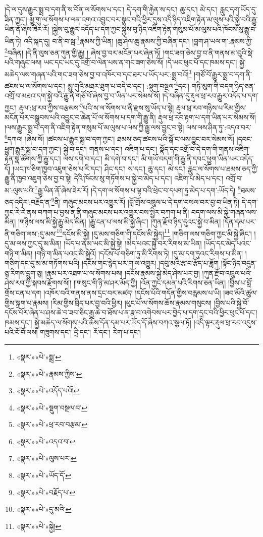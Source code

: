 །དེ་ལ་དུས་རྒྱུར་སྨྲ་བ་དག་ནི་ས་བོན་ལ་སོགས་པ་དང་། དེ་དག་གི་རྐྱེན་ས་དང་། ཆུ་དང་། མེ་དང་། རླུང་དག་ཡོད་དུ་ཟིན་ཀྱང་། མྱུ་གུ་ལ་སོགས་པ་ལན་འགའ་འབྱུང་བར་སྣང་བའི་ཕྱིར་དུས་འདི་ཉིད་འཇིག་རྟེན་མ་ལུས་པའི་སྐྱེ་བའི་རྒྱུ་ཡིན་ནོ་ཞེས་ཟེར་རོ། །སྐྱེས་བུ་རྒྱུར་འདོད་པ་དག་ཀྱང་སྐྱེས་བུ་ཉིད་འཇིག་རྟེན་གསུམ་པོ་མ་ལུས་པའི་ཁོངས་སུ་རྒྱུ་བ་ཡིན་ཏེ། འདི་སྐད་དུ། བ་ནི་བ་སྦ་\footnote{«སྣར་»«པེ་»སྨྲ་}རྣམས་ཀྱི་ཡིན། །ཆུ་ཤེལ་ཆུ་རྣམས་ཀྱི་བཞིན་དང་། །བླག་ཤ་ཡལ་ག་:རྣམས་ཀྱི་\footnote{«སྣར་»«པེ་»རྣམས་ཀྱིས་}བཞིན། །དེ་ནི་ལུས་ཅན་ཀུན་གྱི་རྒྱུ། །
ཞེས་བྱ་བར་མངོན་པར་ཞེན་ཏོ། །གང་ཟག་ཅེས་བྱ་བ་ནི་གནས་མ་བུའི་སྡེ་པའི་གཞུང་ལས། ཡང་དང་ཡང་དུ་འགྲོ་བ་ལེན་པས་ན་གང་ཟག་ཅེས་སོ། །དེ་ཡང་ཕུང་པོ་དང་ཁམས་དང་། སྐྱེ་མཆེད་ལས་གཞན་པའི་གང་ཟག་ཅེས་བྱ་བ་འཁོར་བ་དང་ཐར་པ་ཡོད་པར་:སྨྲ་བའོ།\footnote{«སྣར་»«པེ་»འདོད་པའོ།} །གཙོ་བོ་རྒྱུར་སྨྲ་བ་དག་ནི་ཚངས་པ་ལ་སོགས་པ་དང་། མྱུ་གུའི་མཐར་ཐུག་པ་བདེ་བ་དང་། :སྡུག་བསྔལ་\footnote{«སྣར་»«པེ་»སྡུག་བསྔལ་བ་}དང་། གཏི་མུག་གི་བདག་ཉིད་ཅན་འགྲོ་བ་མཐའ་དག་སྐྱེ་བའི་རྒྱུ་ནི་གཙོ་བོ་ཞེས་བྱ་བ་ཡིན་པར་སེམས་སོ། །དེ་བཞིན་དུ་རྡུལ་ཕྲ་རབ་རྒྱུར་འདོད་པ་དག་ཀྱང་། རྡུལ་:ཕྲ་རབ་ཀྱིས་བརྩམས་\footnote{«སྣར་»«པེ་»ཕྲ་རབ་བརྩམ་}པའི་ས་ལ་སོགས་པ་ནི་རྫས་སུ་ཡོད་པ་སྟེ། རྡུལ་ཕྲ་རབ་གཉིས་པ་རིམ་གྱིས་མངོན་པར་བསྒྲུབས་པའི་འབྱུང་བ་ཆེན་པོ་ལ་སོགས་པ་དག་གི་རྒྱུ་ནི། རྡུལ་ཕྲ་རབ་རྟག་པ་དག་ཡིན་པར་སེམས་སོ། །ལས་རྒྱུར་སྨྲ་བ་དག་ནི་འཇིག་རྟེན་གསུམ་པོ་མ་ལུས་པ་ལས་ཀྱི་རྒྱུ་ལས་བྱུང་བ་སྟེ། ལས་ལས་ཤིན་ཏུ་:འདའ་བར་\footnote{«སྣར་»«པེ་»འདའ་བ་}དཀའ། །ཞེས་སོ། །ཚངས་པ་རྒྱུར་སྨྲ་བ་དག་ཀྱང་། ཐམས་ཅད་ཚངས་པའི་སྒོ་ང་ལས་བྱུང་བར་སེམས་སོ། །དབང་ཕྱུག་རྒྱུར་སྨྲ་བ་དག་ཀྱང་། སྐྱེ་བ་དང་། གནས་པ་དང་། འཇིག་པ་དང་། སྣོད་དང་འགྲོ་བ་དེ་དག་གི་གནས་འཇིག་རྟེན་སྣ་ཚོགས་ཀྱི་རྒྱུ་དང་། ལས་དགེ་བ་དང་། མི་དགེ་བ་དང་། མི་གཡོ་བདག་གི་རྒྱུ་ནི་དབང་ཕྱུག་ཡིན་པར་འདོད་དོ། །ཡང་ཁ་ཅིག་ཁྱབ་འཇུག་ཅེས་པ་རི་དང་། ཤིང་དང་། ས་དང་། ཆུ་དང་། མེ་དང་། རླུང་ལ་སོགས་པ་ཐམས་ཅད་ཀྱི་རྒྱུ་ནི་ཁྱབ་འཇུག་ཅེས་བྱ་བ་སྟེ། དེའི་ཁོངས་སུ་གཏོགས་པ་སྐྱེ་བ་མེད་པ་དང་། འཇིག་པ་མེད་པ་དང་། འགྲོ་བ་མ་:ལུས་པའི་\footnote{«སྣར་»«པེ་»ལུས་པར་}རྒྱུ་ཡིན་ནོ་ཞེས་ཟེར་རོ། །དེ་དག་ལ་སོགས་པ་ལྟ་བའི་ཕྲེང་བ་དཔག་ཏུ་མེད་པ་དག་:ཡོད་དེ། \footnote{«སྣར་»«པེ་»ཡོད་དོ་}ཐམས་ཅད་འདིར་:བརྗོད་ན་\footnote{«སྣར་»«པེ་»བརྗོད་པ་}ནི། གཞུང་མངས་པར་འགྱུར་རོ། །བློ་གྲོས་འཁྲུལ་པ་དེ་དག་བསལ་བར་བྱ་བ་ཡིན་ཏེ། དེ་དག་ཀྱང་རེ་རེ་ནས་བཀག་པ་བྱས་ན་ནི་གཞུང་མངས་པར་འགྱུར་བས་སྤྱིར་བཀག་པ་ནི། བདག་ལས་མི་སྐྱེ་གཞན་ལས་མིན། །གཉིས་ལས་མི་སྐྱེ་རྒྱུ་མེད་མིན། །རྒྱུ་ངན་པ་ལས་མི་སྐྱེ་ཞིང་། །ཀུན་རྫོབ་ཉིད་དུའང་སྐྱེ་བ་མིན། །དོན་དམ་པར་ནི་གཅིག་ལས་:དུ་མས་\footnote{«སྣར་»«པེ་»དུ་མའི་}དངོས་མི་སྐྱེ། །དུ་མས་གཅིག་གི་དངོས་མི་སྐྱེད།\footnote{«སྣར་»«པེ་»སྐྱེ།} །གཅིག་ལས་གཅིག་ཀྱང་མི་སྐྱེ་ཞིང་། །དུ་མ་ལས་ཀྱང་དུ་མ་མིན། །ཡོད་པ་ནམ་ཡང་མི་སྐྱེ་སྟེ། །མེད་པའང་སྐྱེ་བར་རིགས་མ་ཡིན། །ཡོད་དང་མེད་པའང་གཉི་ག་མིན། །གཉི་ག་མིན་པའང་མི་སྐྱེའོ། །དངོས་པོ་གཅིག་ཏུ་མི་རིགས་ཏེ། །དུ་མ་དག་ཏུའང་རིགས་པ་མིན། །གཅིག་དང་དུ་མ་མ་གཏོགས་པའི། །དངོས་གང་རྙེད་པར་ག་ལ་འགྱུར། །དབུ་མའི་རྩ་བ་རྩོད་པ་ཟློག །སྟོང་ཉིད་བདུན་ཅུ་རིགས་དྲུག་ཅུ། །རྣམ་པར་འཐག་པ་ལ་སོགས་པས། །དངོས་རྣམས་སྐྱེ་མེད་ཤེས་པར་བྱ། །ཀུན་རྫོབ་འཁྲུལ་པའི་ཤེས་རབ་ཀྱི་སྐབས་རྫོགས་སོ།། །།གསུང་གི་ཉི་མ་ཤར་མོད་ཀྱི། །འོན་ཀྱང་དམན་པའི་རིགས་ཅན་ཡིན། །བྱིས་པ་བློ་གྲོས་ངན་པ་དག །འཁོར་བའི་གནས་ནས་དྲང་བར་མཛད། །དངོས་པོའི་གདོན་གྱིས་བརླམས་པ་ཡི། །ཟབ་མོའི་ཚུལ་གྱིས་སྐྲག་པ་རྣམས། །རིམ་གྱིས་བྲིད་པར་བྱ་བའི་ཕྱིར། །ཕུང་པོ་ལ་སོགས་ཆོས་རྣམས་གསུངས། །བྱིས་པའི་སྐྱེ་བོ་དངོས་པོར་ཞེན་པ་ཤས་ཆེ་བ་ཟབ་ཅིང་རྒྱ་ཆེ་བ་ཐོས་པ་ན་རྣ་བ་འགེབས་པར་བྱེད་པ་དག་དྲང་བའི་ཕྱིར་ཕུང་པོ་དང་། ཁམས་དང་། སྐྱེ་མཆེད་ལ་སོགས་པའི་ཆོས་དོན་དམ་པར་ཡོད་དོ་ཞེས་བཀའ་སྩལ་ཏོ། །འདི་ལྟར་རྡུལ་ཕྲ་རབ་འདུས་པའི་ངོ་བོ་ལས། གཟུགས་དང་། དྲི་དང་། རོ་དང་། རེག་པ་དང་། 